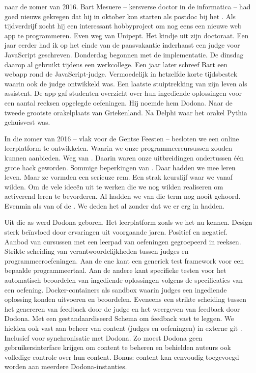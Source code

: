  naar de zomer van 2016.
Bart Mesuere -- kersverse doctor in de informatica -- had goed nieuws gekregen dat hij in oktober kon starten als postdoc bij het .
Als tijdverdrijf zocht hij een interessant hobbyproject om nog eens een nieuwe web app te programmeren.
Even weg van Unipept.
Het kindje uit zijn doctoraat.
Een jaar eerder had ik op het einde van de paasvakantie inderhaast een  judge voor JavaScript geschreven.
Donderdag begonnen met de implementatie.
De dinsdag daarop al gebruikt tijdens een werkcollege.
Een jaar later schreef Bart een webapp rond de JavaScript-judge.
Vermoedelijk in hetzelfde korte tijdsbestek waarin ook de judge ontwikkeld was.
Een laatste stuiptrekking van zijn leven als assistent.
De app gaf studenten overzicht over hun ingediende oplossingen voor een aantal reeksen opgelegde oefeningen.
Hij noemde hem Dodona.
Naar de tweede grootste orakelplaats van Griekenland.
Na Delphi waar het orakel Pythia gehuisvest was.

In die zomer van 2016 -- vlak voor de Gentse Feesten -- besloten we een online leerplatform te ontwikkelen.
Waarin we onze programmeercursussen zouden kunnen aanbieden.
Weg van .
Daarin waren onze uitbreidingen ondertussen één grote hack geworden.
Sommige beperkingen van .
Daar hadden we mee leren leven.
Maar ze vormden een serieuze rem.
Een strak keurslijf waar we vanaf wilden.
Om de vele ideeën uit te werken die we nog wilden realiseren om activerend leren te bevorderen.
Al hadden we van die term nog nooit gehoord.
Evenmin als van  of de .
We deden het al zonder dat we er erg in hadden.

Uit die as werd Dodona geboren.
Het leerplatform zoals we het nu kennen.
Design sterk beïnvloed door ervaringen uit voorgaande jaren.
Positief en negatief.
Aanbod van cursussen met een leerpad van oefeningen gegroepeerd in reeksen.
Strikte scheiding van verantwoordelijkheden tussen judges en programmeeroefeningen.
Aan de ene kant een generiek test framework voor een bepaalde programmeertaal.
Aan de andere kant specifieke testen voor het automatisch beoordelen van ingediende oplossingen volgens de specificaties van een oefening. 
Docker-containers als sandbox waarin judges een ingediende oplossing konden uitvoeren en beoordelen.
Eveneens een strikte scheiding tussen het genereren van feedback door de judge en het weergeven van feedback door Dodona.
Met een gestandaardiseerd  Schema om feedback vast te leggen.
We hielden ook vast aan beheer van content (judges en oefeningen) in externe git .
Inclusief  voor synchronisatie met Dodona.
Zo moest Dodona geen gebruikersinterface krijgen om content te beheren en behielden auteurs ook volledige controle over hun content.
Bonus: content kan eenvoudig toegevoegd worden aan meerdere Dodona-instanties.

